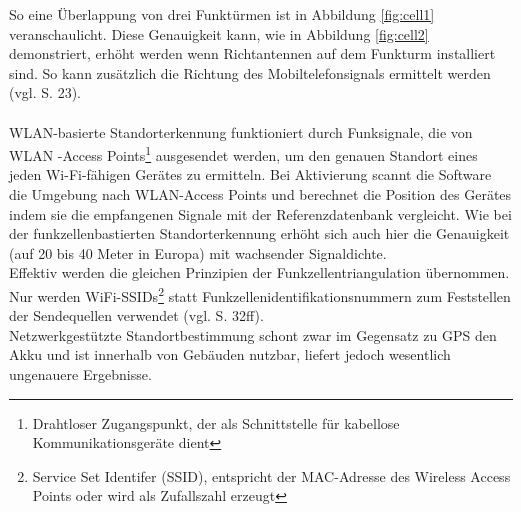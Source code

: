So eine Überlappung von drei Funktürmen ist in Abbildung \ref{fig:cell1} veranschaulicht. Diese Genauigkeit kann, wie in Abbildung \ref{fig:cell2} demonstriert, erhöht werden wenn Richtantennen auf dem Funkturm installiert sind. So kann zusätzlich die Richtung des Mobiltelefonsignals ermittelt werden (vgl. \cite{gps} S. 23). \\\\
\gls{WLAN}-basierte Standorterkennung funktioniert durch Funksignale, die von \gls{WLAN} -Access Points\footnote{ Drahtloser Zugangspunkt, der als Schnittstelle für kabellose Kommunikationsgeräte dient} ausgesendet werden, um den genauen Standort eines jeden Wi-Fi-fähigen Gerätes zu ermitteln. Bei Aktivierung scannt die Software die Umgebung nach \gls{WLAN}-Access Points und berechnet die Position des Gerätes indem sie die empfangenen Signale mit der Referenzdatenbank vergleicht. Wie bei der funkzellenbastierten Standorterkennung erhöht sich auch hier die Genauigkeit (auf 20 bis 40 Meter in Europa) mit wachsender Signaldichte. \\
Effektiv werden die gleichen Prinzipien der Funkzellentriangulation übernommen. Nur werden WiFi-SSIDs\footnote{ Service Set Identifer (SSID), entspricht der MAC-Adresse des Wireless Access Points oder wird als Zufallszahl erzeugt} statt Funkzellenidentifikationsnummern zum Feststellen der Sendequellen verwendet (vgl. \cite{gps} S. 32ff). \\
Netzwerkgestützte Standortbestimmung schont zwar im Gegensatz zu \gls{GPS} den Akku und ist innerhalb von Gebäuden nutzbar, liefert jedoch wesentlich ungenauere Ergebnisse.
